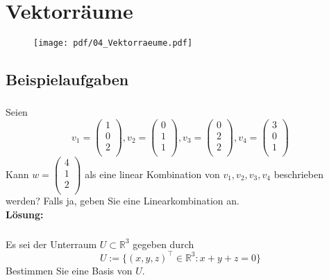 \section{Vektorräume}
\begin{figure}[h!]
    \texttt{[image: pdf/04\_Vektorraeume.pdf]}
\end{figure}
\newpage


\subsection{Beispielaufgaben} 
\vspace{1cm}
\subsubsection{} %
Seien
\[
v_1 = 
\begin{pmatrix}
1\\
0\\
2\\
\end{pmatrix}, v_2 =
\begin{pmatrix}
0\\
1\\
1\\
\end{pmatrix}, v_3=
\begin{pmatrix}
0\\
2\\
2\\
\end{pmatrix}, v_4=
\begin{pmatrix}
3\\
0\\
1\\
\end{pmatrix}
\]
Kann $w = \begin{pmatrix}
4\\
1\\
2\\
\end{pmatrix}$ als eine linear Kombination von $v_1,v_2,v_3,v_4$ beschrieben werden? Falls ja, geben Sie eine Linearkombination an. \\

\noindent \textbf{Lösung:}

\newpage
\subsubsection{} %
Es sei der Unterraum $U \subset \mathbb{R}^3$ gegeben durch 
\[
U := \{(x,y,z)^\top \in \mathbb{R}^3:x+y+z=0\}
\]
Bestimmen Sie eine Basis von $U$. \\

